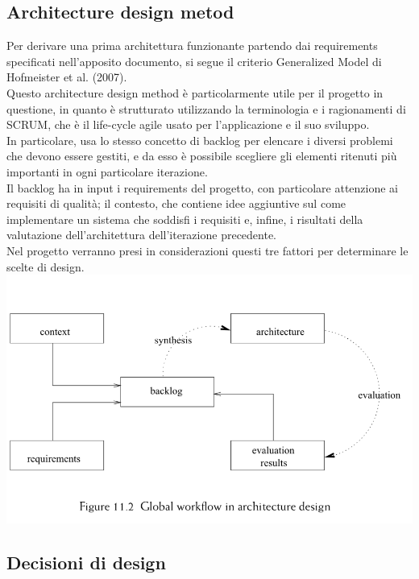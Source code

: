 \documentclass{article}
\begin{document}
\subsection{Architecture design metod }
Per derivare una prima architettura funzionante partendo dai requirements specificati nell’apposito documento, si segue il criterio Generalized Model di Hofmeister et al. (2007).
\\Questo architecture design method è particolarmente utile per il progetto in questione, in quanto è strutturato utilizzando la terminologia e i ragionamenti di SCRUM, che è il life-cycle agile usato per l’applicazione e il suo sviluppo. 
\\In particolare, usa lo stesso concetto di backlog per elencare i diversi problemi che devono essere gestiti, e da esso è possibile scegliere gli elementi ritenuti più importanti in ogni particolare iterazione. 
\\Il backlog ha in input i requirements del progetto, con particolare attenzione ai requisiti di qualità; il contesto, che contiene idee aggiuntive sul come implementare un sistema che soddisfi i requisiti e, infine, i risultati della valutazione dell’architettura dell’iterazione precedente. 
\\Nel progetto verranno presi in considerazioni questi tre fattori per determinare le scelte di design. 
\\\includegraphics[scale = 0.75]{"Immagini/GeneralizedModel.png"}
\subsection{Decisioni di design} 
\end{document}
